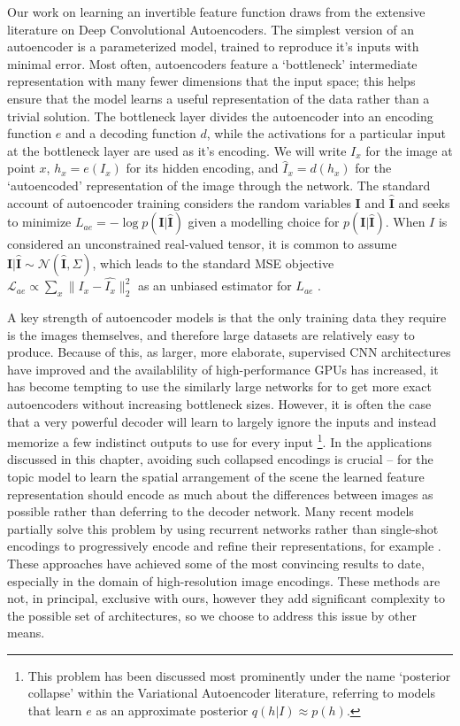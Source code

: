 Our work on learning an invertible feature function draws from the extensive literature on Deep Convolutional Autoencoders. The simplest version of an autoencoder is a parameterized model, trained to reproduce it's inputs with minimal error. Most often, autoencoders feature a `bottleneck' intermediate representation with many fewer dimensions that the input space; this helps ensure that the model learns a useful representation of the data rather than a trivial solution. The bottleneck layer divides the autoencoder into an encoding function $e$ and a decoding function $d$, while the activations for a particular input at the bottleneck layer are used as it's encoding. We will write $I_x$ for the image at point $x$, $h_x = e(I_x)$ for its hidden encoding, and $\hat{I}_x = d(h_x)$ for the `autoencoded' representation of the image through the network. The standard account of autoencoder training considers the random variables $\mathbf{I}$ and $\mathbf{\hat{I}}$ and seeks to minimize $L_{ae} = -\log p(\mathbf{I} | \mathbf{\hat{I}})$ given a modelling choice for $p(\mathbf{I} | \mathbf{\hat{I}})$. When $I$ is considered an unconstrained real-valued tensor, it is common to assume $\mathbf{I}|\mathbf{\hat{I}} \sim \mathcal{N}(\mathbf{\hat{I}}, \Sigma)$, which leads to the standard MSE objective $\mathcal{L}_{ae} \propto \sum_x \| I_x - \hat{I_x}\|_2^2$ as an unbiased estimator for $L_{ae}$ \citep{vincent2010stacked}.

A key strength of autoencoder models is that the only training data they require is the images themselves, and therefore large datasets are relatively easy to produce. Because of this, as larger, more elaborate, supervised CNN architectures have improved and the availablility of high-performance GPUs has increased, it has become tempting to use the similarly large networks for to get more exact autoencoders without increasing bottleneck sizes. However, it is often the case that a very powerful decoder will learn to largely ignore the inputs and instead memorize a few indistinct outputs to use for every input \citep{vincent2010stacked,Chen2016}\footnote{This problem has been discussed most prominently under the name `posterior collapse' within the Variational Autoencoder literature, referring to models that learn $e$ as an approximate posterior $q(h | I) \approx p(h)$.}. In the applications discussed in this chapter, avoiding such collapsed encodings is crucial -- for the topic model to learn the spatial arrangement of the scene the learned feature representation should encode as much about the differences between images as possible rather than deferring to the decoder network. Many recent models partially solve this problem by using recurrent networks rather than single-shot encodings to progressively encode and refine their representations, for example \citep{OordPixelCNN,Chen2016,Gregor2016}. These approaches have achieved some of the most convincing results to date, especially in the domain of high-resolution image encodings. These methods are not, in principal, exclusive with ours, however they add significant complexity to the possible set of architectures, so we choose to address this issue by other means.

